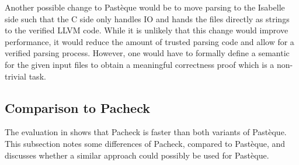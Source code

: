 Another possible change to Pastèque would be to move parsing to the Isabelle side such that the C side only handles IO and hands the files directly as strings to the verified LLVM code.
While it is unlikely that this change would improve performance, it would reduce the amount of trusted parsing code and allow for a verified parsing process.
However, one would have to formally define a semantic for the given input files to obtain a meaningful correctness proof which is a non-trivial task.

\subsection{Comparison to Pacheck}\label{sec:pacheck-comparison}
The evaluation in  shows that Pacheck is faster than both variants of Pastèque.
This subsection notes some differences of Pacheck, compared to Pastèque, and discusses whether a similar approach could possibly be used for Pastèque.

